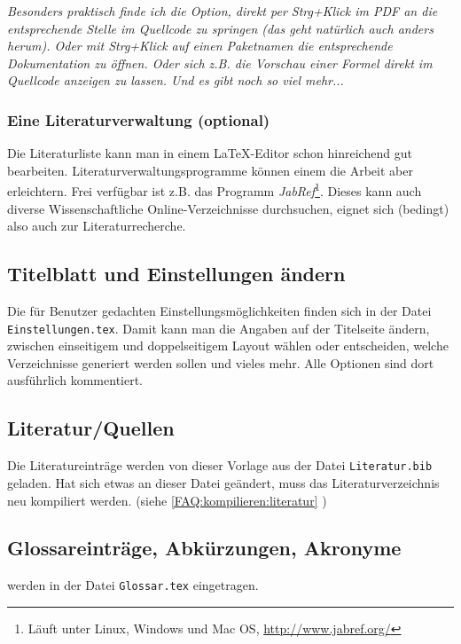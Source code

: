			\emph{Besonders praktisch finde ich die Option, direkt per Strg+Klick im PDF an die entsprechende Stelle im Quellcode zu springen (das geht natürlich auch anders herum). Oder mit Strg+Klick auf einen Paketnamen die entsprechende Dokumentation zu öffnen. Oder sich z.B. die Vorschau einer Formel direkt im Quellcode anzeigen zu lassen. Und es gibt noch so viel mehr...}
			
			\subsubsection{Eine Literaturverwaltung (optional)}
			Die Literaturliste kann man in einem \LaTeX-Editor schon hinreichend gut bearbeiten.
			Literaturverwaltungsprogramme können einem die Arbeit aber erleichtern.
			Frei verfügbar ist z.B. das Programm \emph{JabRef}\footnote{Läuft unter Linux, Windows und Mac OS, \url{http://www.jabref.org/}}.
			Dieses kann auch diverse Wissenschaftliche Online-Verzeichnisse durchsuchen, eignet sich (bedingt) also auch zur Literaturrecherche.
		
			
		\subsection{Titelblatt und Einstellungen ändern}\label{FAQ:Einstellungen}
			Die für Benutzer gedachten Einstellungsmöglichkeiten finden sich in der Datei \lstinline|Einstellungen.tex|.
%			
			Damit kann man \zb{} die Angaben auf der Titelseite ändern, zwischen einseitigem und doppelseitigem Layout wählen oder entscheiden, welche Verzeichnisse generiert werden sollen und vieles mehr. Alle Optionen sind dort ausführlich kommentiert.
			
		\subsection{Literatur/Quellen}
			Die Literatureinträge werden von dieser Vorlage aus der Datei \lstinline|Literatur.bib| geladen.
			Hat sich etwas an dieser Datei geändert, muss das Literaturverzeichnis neu kompiliert werden. (siehe \ref{FAQ:kompilieren:literatur} \emph{})
			
		\subsection{Glossareinträge, Abkürzungen, Akronyme}
			werden in der Datei \lstinline|Glossar.tex| eingetragen.
		
